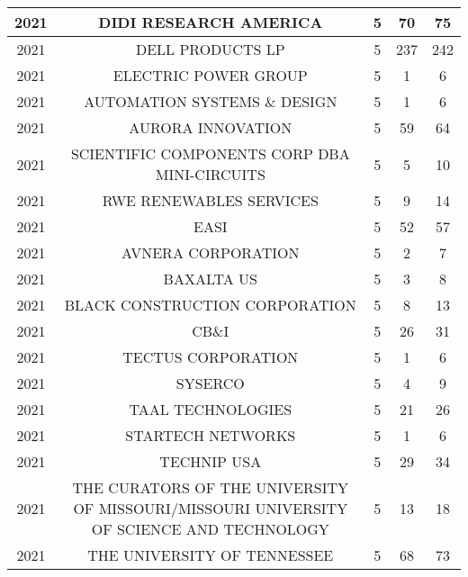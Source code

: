 \documentclass{article}%
\begin{document}
\begin{longtable}{c|c|c|c|c}
\hline%
2021&DIDI RESEARCH AMERICA&5&70&75\\%
\hline%
2021&DELL PRODUCTS LP&5&237&242\\%
\hline%
2021&ELECTRIC POWER GROUP&5&1&6\\%
\hline%
2021&AUTOMATION SYSTEMS \& DESIGN&5&1&6\\%
\hline%
2021&AURORA INNOVATION&5&59&64\\%
\hline%
2021&SCIENTIFIC COMPONENTS CORP DBA MINI{-}CIRCUITS&5&5&10\\%
\hline%
2021&RWE RENEWABLES SERVICES&5&9&14\\%
\hline%
2021&EASI&5&52&57\\%
\hline%
2021&AVNERA CORPORATION&5&2&7\\%
\hline%
2021&BAXALTA US&5&3&8\\%
\hline%
2021&BLACK CONSTRUCTION CORPORATION&5&8&13\\%
\hline%
2021&CB\&I&5&26&31\\%
\hline%
2021&TECTUS CORPORATION&5&1&6\\%
\hline%
2021&SYSERCO&5&4&9\\%
\hline%
2021&TAAL TECHNOLOGIES&5&21&26\\%
\hline%
2021&STARTECH NETWORKS&5&1&6\\%
\hline%
2021&TECHNIP USA&5&29&34\\%
\hline%
2021&THE CURATORS OF THE UNIVERSITY OF MISSOURI/MISSOURI UNIVERSITY OF SCIENCE AND TECHNOLOGY&5&13&18\\%
\hline%
2021&THE UNIVERSITY OF TENNESSEE&5&68&73\\%
\hline%
\end{longtable}

%
\end{document}
